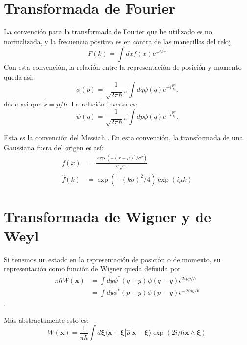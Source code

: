 \documentclass[a4paper,10pt]{article}
\newcommand{\xfase}{\mathbf{x}}
\newcommand{\xifase}{ {\boldsymbol{\xi}} }
\newcommand{\bra}[1]{\langle #1|}
\newcommand{\ket}[1]{|#1\rangle}
\begin{document}
\section{Transformada de Fourier}
La convención para la transformada de Fourier que he utilizado es
no normalizada, y la frecuencia positiva es en contra de las manecillas
del reloj.
\begin{equation}
F(k)=\int dx f(x)e^{-ikx}
\end{equation}
Con esta convención, la relación entre la representación de posición
y momento queda asi:
\begin{equation}
\phi(p)=\frac{1}{\sqrt{2\pi\hbar}^n} \int dq \psi(q)e^{-i\frac{pq}{\hbar}}.
\end{equation}
dado asi que $k=p/\hbar$. La relación inversa es:
\begin{equation}
\psi(q)=\frac{1}{\sqrt{2\pi\hbar}^n} \int dp \phi(q)e^{+i\frac{pq}{\hbar}}.
\end{equation}

Esta es la convención del Messiah \cite{Messiah}.
En esta convención, la transformada de una Gaussiana fuera del origen es así:
\begin{equation}
\begin{split}
 f(x)&=\frac{\exp(-(x-\mu)^2/\sigma^2)}
 {\sigma\sqrt \pi}\\
 \hat{f}(k)&=\exp(-(k\sigma)^2/4)\exp(i\mu k)
\end{split}
\end{equation}


\section{Transformada de Wigner y de Weyl}

Si tenemos un estado en la representación de posición o de momento, 
su representación
como función de Wigner queda definida por
\begin{equation}
\begin{split}
\pi \hbar W(\xfase) &=\int dy \psi^*(q+y)\psi(q-y)e^{2ipy/\hbar}\\
&=\int dy \phi^*(p+y)\phi(p-y)e^{-2iqy/\hbar}
\end{split}
\end{equation}.

Más abstractamente esto es:
\begin{equation}
W(\xfase)= \frac{1}{\pi\hbar}\int d \xifase 
\bra{\xfase+\xifase} \hat{\rho} \ket{\xfase-\xifase}
\exp(2i/\hbar \xfase\wedge\xifase) 
\end{equation}
\end{document}
